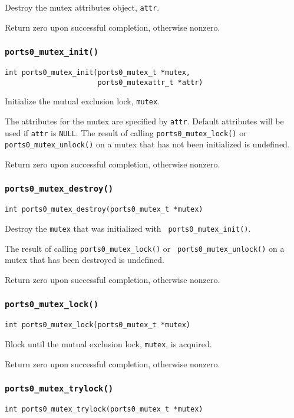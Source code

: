 Destroy the mutex attributes object, {\tt attr}.

Return zero upon successful completion, otherwise nonzero.


\subsubsection{\tt ports0\_mutex\_init()}
\begin{verbatim}
int ports0_mutex_init(ports0_mutex_t *mutex,
                      ports0_mutexattr_t *attr)
\end{verbatim}

Initialize the mutual exclusion lock, {\tt mutex}. 

The attributes for the mutex are specified by {\tt attr}.  Default
attributes will be used if {\tt attr} is {\tt NULL}.  The result of
calling {\tt ports0\_mutex\_lock()} or {\tt ports0\_mutex\_unlock()}
on a mutex that has not been initialized is undefined.

Return zero upon successful completion, otherwise nonzero.


\subsubsection{\tt ports0\_mutex\_destroy()}
\begin{verbatim}
int ports0_mutex_destroy(ports0_mutex_t *mutex)
\end{verbatim}

Destroy the {\tt mutex} that was initialized with {\tt
ports0\_mutex\_init()}.

The result of calling {\tt ports0\_mutex\_lock()} or {\tt
ports0\_mutex\_unlock()} on a mutex that has been destroyed is
undefined.

Return zero upon successful completion, otherwise nonzero.


\subsubsection{\tt ports0\_mutex\_lock()}
\begin{verbatim}
int ports0_mutex_lock(ports0_mutex_t *mutex)
\end{verbatim}

Block until the mutual exclusion lock, {\tt mutex}, is acquired.

Return zero upon successful completion, otherwise nonzero.


\subsubsection{\tt ports0\_mutex\_trylock()}
\begin{verbatim}
int ports0_mutex_trylock(ports0_mutex_t *mutex)
\end{verbatim}

